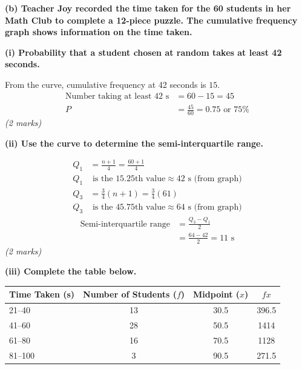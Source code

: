 \documentclass[12pt,a4paper]{article}
\newcommand{\subhead}[1]{\vspace{0.3em}\noindent\textbf{#1}\par}
\newcommand{\qmarks}[1]{\hfill\textit{(#1)}}
\begin{document}
\subhead{(b) Teacher Joy recorded the time taken for the 60 students in her Math Club to complete a 12-piece puzzle. The cumulative frequency graph shows information on the time taken.}

\begin{center}
\end{center}

\subhead{(i) Probability that a student chosen at random takes at least 42 seconds.}

From the curve, cumulative frequency at 42 seconds is $15$.
\begin{align*}
\text{Number taking at least 42 s} &= 60 - 15 = 45 \\
P &= \frac{45}{60} = 0.75 \text{ or } 75\%
\end{align*}
\qmarks{2 marks}

\subhead{(ii) Use the curve to determine the semi-interquartile range.}
\begin{align*}
Q_1 &= \frac{n+1}{4} = \frac{60+1}{4} \\
Q_1 &\text{ is the } 15.25\text{th value} \approx 42\text{ s (from graph)}
\end{align*}
\begin{align*}
Q_3 &= \frac{3}{4}(n+1) = \frac{3}{4}(61) \\
Q_3 &\text{ is the } 45.75\text{th value} \approx 64\text{ s (from graph)}
\end{align*}
\begin{align*}
\text{Semi-interquartile range} &= \frac{Q_3 - Q_1}{2} \\
&= \frac{64 - 42}{2} = 11 \text{ s}
\end{align*}
\qmarks{2 marks}

\subhead{(iii) Complete the table below.}

\begin{center}
\begin{tabular}{|l|c|c|c|}
\hline
Time Taken (s) & Number of Students ($f$) & Midpoint ($x$) & $fx$ \\ \hline
21--40 & 13 & 30.5 & 396.5 \\ \hline
41--60 & 28 & 50.5 & 1414 \\ \hline
61--80 & 16 & 70.5 & 1128 \\ \hline
81--100 & 3 & 90.5 & 271.5 \\ \hline
\end{tabular}
\end{center}
\end{document}
